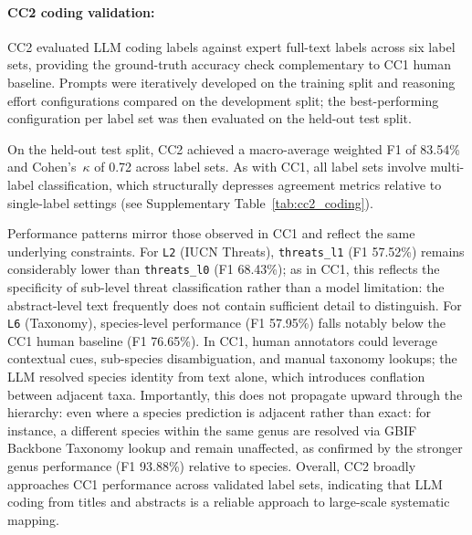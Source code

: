 \documentclass[12pt]{article}
\begin{document}
\paragraph*{CC2 coding validation:}
CC2 evaluated LLM coding labels against expert full-text labels across six label sets, providing the ground-truth accuracy check complementary to CC1 human baseline. Prompts were iteratively developed on the training split and reasoning effort configurations compared on the development split; the best-performing configuration per label set was then evaluated on the held-out test split.

On the held-out test split, CC2 achieved a macro-average weighted F1 of 83.54\% and Cohen's~$\kappa$ of 0.72 across label sets. As with CC1, all label sets involve multi-label classification, which structurally depresses agreement metrics relative to single-label settings (see Supplementary Table~\ref{tab:cc2_coding}).

Performance patterns mirror those observed in CC1 and reflect the same underlying constraints. For \texttt{L2} (IUCN Threats), \texttt{threats\_l1} (F1 57.52\%) remains considerably lower than \texttt{threats\_l0} (F1 68.43\%); as in CC1, this reflects the specificity of sub-level threat classification rather than a model limitation: the abstract-level text frequently does not contain sufficient detail to distinguish. For \texttt{L6} (Taxonomy), species-level performance (F1 57.95\%) falls notably below the CC1 human baseline (F1 76.65\%). In CC1, human annotators could leverage contextual cues, sub-species disambiguation, and manual taxonomy lookups; the LLM resolved species identity from text alone, which introduces conflation between adjacent taxa. Importantly, this does not propagate upward through the hierarchy: even where a species prediction is adjacent rather than exact: for instance, a different species within the same genus are resolved via GBIF Backbone Taxonomy lookup and remain unaffected, as confirmed by the stronger genus performance (F1 93.88\%) relative to species. Overall, CC2 broadly approaches CC1 performance across validated label sets, indicating that LLM coding from titles and abstracts is a reliable approach to large-scale systematic mapping.
\end{document}
